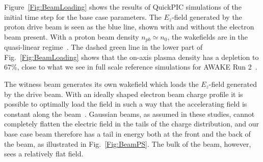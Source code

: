 \documentclass[aps,prstab,reprint,amsmath,amssymb,groupedaddress]{revtex4-1}
\begin{document}
Figure~\ref{Fig:BeamLoading} shows the results of QuickPIC simulations of the initial time step for the base case
parameters. The $E_{z}$-field generated by the proton drive beam is seen as the blue line, shown with and without the
electron beam present. With a proton beam density $n_{pb} \simeq n_{0}$, the wakefields are in the quasi-linear
regime~\cite{rosenzweig:2010}. The dashed green line in the lower part of Fig.~\ref{Fig:BeamLoading} shows that the
on-axis plasma density has a depletion to $67\%$, close to what we see in full scale reference simulations for AWAKE
Run 2~\cite{awake_collaboration:2016}.


The witness beam generates its own wakefield which loads the $E_{z}$-field generated by the drive beam. With an ideally
shaped electron beam charge profile it is possible to optimally load the field in such a way that the accelerating field
is constant along the beam~\cite{katsouleas:1987, tzoufras:2009}. Gaussian beams, as assumed in these studies, cannot
completely flatten the electric field in the tails of the charge distribution, and our base case beam therefore has a
tail in energy both at the front and the back of the beam, as illustrated in Fig.~\ref{Fig:BeamPS}. The bulk of the
beam, however, sees a relatively flat field.
\end{document}
